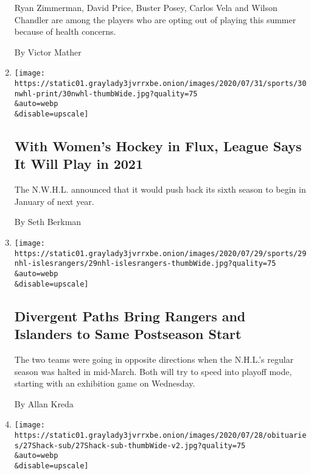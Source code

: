 \begin{enumerate}
  Ryan Zimmerman, David Price, Buster Posey, Carlos Vela and Wilson
  Chandler are among the players who are opting out of playing this
  summer because of health concerns.

  By Victor Mather
\item
  \href{/2020/07/30/sports/hockey/nwhl-postpone-season.html}{}

  \texttt{[image: https://static01.graylady3jvrrxbe.onion/images/2020/07/31/sports/30nwhl-print/30nwhl-thumbWide.jpg?quality=75\\\&auto=webp\\\&disable=upscale]}

  \hypertarget{with-womens-hockey-in-flux-league-says-it-will-play-in-2021}{%
  \subsection{With Women's Hockey in Flux, League Says It Will Play in
  2021}\label{with-womens-hockey-in-flux-league-says-it-will-play-in-2021}}

  The N.W.H.L. announced that it would push back its sixth season to
  begin in January of next year.

  By Seth Berkman
\item
  \href{/2020/07/29/sports/hockey/new-york-rangers-islanders-playoffs.html}{}

  \texttt{[image: https://static01.graylady3jvrrxbe.onion/images/2020/07/29/sports/29nhl-islesrangers/29nhl-islesrangers-thumbWide.jpg?quality=75\\\&auto=webp\\\&disable=upscale]}

  \hypertarget{divergent-paths-bring-rangers-and-islanders-to-same-postseason-start}{%
  \subsection{Divergent Paths Bring Rangers and Islanders to Same
  Postseason
  Start}\label{divergent-paths-bring-rangers-and-islanders-to-same-postseason-start}}

  The two teams were going in opposite directions when the N.H.L.'s
  regular season was halted in mid-March. Both will try to speed into
  playoff mode, starting with an exhibition game on Wednesday.

  By Allan Kreda
\item
  \href{/2020/07/27/sports/hockey/eddie-shack-feisty-wing-for-powerful-maple-leafs-dies-at-83.html}{}

  \texttt{[image: https://static01.graylady3jvrrxbe.onion/images/2020/07/28/obituaries/27Shack-sub/27Shack-sub-thumbWide-v2.jpg?quality=75\\\&auto=webp\\\&disable=upscale]}


\end{enumerate}
